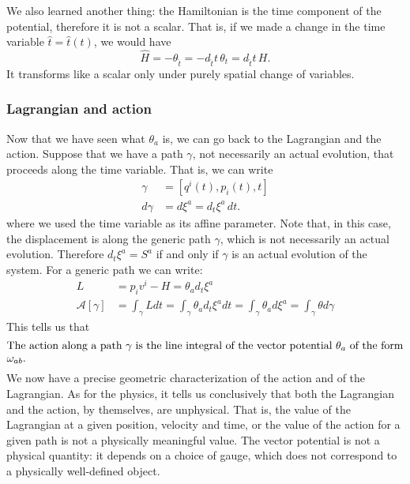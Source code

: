 We also learned another thing: the Hamiltonian is the time component of the potential, therefore it is not a scalar. That is, if we made a change in the time variable $\hat{t} = \hat{t}(t)$, we would have
\begin{equation}\label{cp-rm-lm-energyTimeComponent}
	\hat{H} = - \theta_{\hat{t}} = - d_{\hat{t}} t \,  \theta_t = d_{\hat{t}} t \, H.
\end{equation}
It transforms like a scalar only under purely spatial change of variables.

\subsubsection{Lagrangian and action}

Now that we have seen what $\theta_a$ is, we can go back to the Lagrangian and the action. Suppose that we have a path $\gamma$, not necessarily an actual evolution, that proceeds along the time variable. That is, we can write
\begin{equation}
	\begin{aligned}
		\gamma &= [q^i(t), p_i(t), t] \\
		d\gamma &= d \xi^a = d_t \xi^a \, dt.
	\end{aligned}
\end{equation}
where we used the time variable as its affine parameter. Note that, in this case, the displacement is along the generic path $\gamma$, which is not necessarily an actual evolution. Therefore $d_t \xi^a = S^a$ if and only if $\gamma$ is an actual evolution of the system. For a generic path we can write:
\begin{equation}
	\begin{aligned}
		L &= p_i v^i - H = \theta_a d_t \xi^a \\
		\mathcal{A}[\gamma] &= \int_\gamma L dt =  \int_\gamma \theta_a d_t \xi^a dt = \int_\gamma \theta_a d \xi^a = \int_\gamma \theta d\gamma
	\end{aligned}
\end{equation}
This tells us that
\begin{equation}
	\parbox{5in}{The action along a path $\gamma$ is the line integral of the vector potential $\theta_a$ of the form $\omega_{ab}$.}
\end{equation} 
We now have a precise geometric characterization of the action and of the Lagrangian. As for the physics, it tells us conclusively that both the Lagrangian and the action, by themselves, are unphysical. That is, the value of the Lagrangian at a given position, velocity and time, or the value of the action for a given path is not a physically meaningful value. The vector potential is not a physical quantity: it depends on a choice of gauge, which does not correspond to a physically well-defined object.

